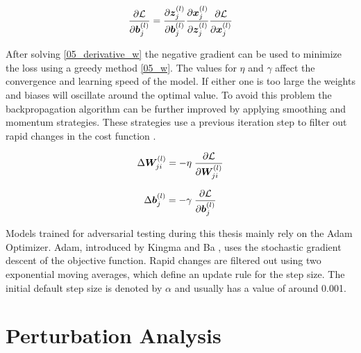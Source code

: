 \begin{equation}
\label{05_derivative_b}
\begin{aligned}
  \frac{\partial \mathcal{L}}{\partial \bm{b}_{j}^{(l)}} = \frac{\partial \bm{z}_j^{(l)}}{\partial \bm{b}_{j}^{(l)}} \frac{\partial \bm{x}_j^{(l)}}{\partial \bm{z}_j^{(l)}} \frac{\partial \mathcal{L}}{\partial \bm{x}_j^{(l)}}
\end{aligned}
\end{equation}

\begingroup
After solving \ref{05_derivative_w} the negative gradient can be used to minimize the loss using a greedy method \ref{05_w}. The values for $\eta$
and $\gamma$ affect the convergence and learning speed of the model. If either one is too large the weights and biases will
oscillate around the optimal value. To avoid this problem the backpropagation algorithm can be further improved by applying smoothing and momentum strategies. These
strategies use a previous iteration step to filter out rapid changes in the cost function \cite{NeuralIntro, EffBackprop}.
\endgroup


\begin{equation}
\label{05_w}
\begin{aligned}
  \Delta \bm{W}_{j i}^{(l)} = - \eta \; \frac{\partial \mathcal{L}}{\partial \bm{W}_{j i}^{(l)}}
\end{aligned}
\end{equation}

\begin{equation}
\label{05_b}
\begin{aligned}
  \Delta \bm{b}_{j}^{(l)} = - \gamma \; \frac{\partial \mathcal{L}}{\partial \bm{b}_{j}^{(l)}}
\end{aligned}
\end{equation}

\begingroup
Models trained for adversarial testing during this thesis mainly rely on the Adam Optimizer. Adam, introduced by Kingma and Ba
\cite{Adam}, uses the stochastic gradient descent of the objective function. Rapid changes are filtered out using two exponential
moving averages, which define an update rule for the step size. The initial default step size is denoted by $\alpha$ and usually
has a value of around 0.001.
\endgroup


\section{Perturbation Analysis}\label{sec:section}

